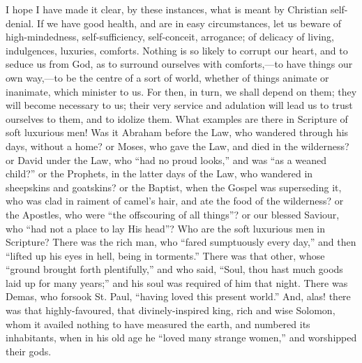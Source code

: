 I hope I have made it clear, by these instances, what is meant by
Christian self-denial. If we have good health, and are in easy
circumstances, let us beware of high-mindedness, self-sufficiency,
self-conceit, arrogance; of delicacy of living, indulgences, luxuries,
comforts. Nothing is so likely to corrupt our heart, and to seduce us
from God, as to surround ourselves with comforts,—to have things our
own way,—to be the centre of a sort of world, whether of things
animate or inanimate, which minister to us. For then, in turn, we
shall depend on them; they will become necessary to us; their very
service and adulation will lead us to trust ourselves to them, and to
idolize them. What examples are there in Scripture of soft luxurious
men! Was it Abraham before the Law, who wandered through his days,
without a home? or Moses, who gave the Law, and died in the
wilderness? or David under the Law, who ``had no proud
looks,'' and was ``as a weaned child?'' or the Prophets,
in the latter days of the Law, who wandered in sheepskins and
goatskins? or the Baptist, when the Gospel was superseding it, who was
clad in raiment of camel's hair, and ate the food of the wilderness?
or the Apostles, who were ``the offscouring of all things''?
or our blessed Saviour, who ``had not a place to lay His
head''? Who are the soft luxurious men in Scripture? There was the
rich man, who ``fared sumptuously every day,'' and then
``lifted up his eyes in hell, being in torments.'' There was
that other, whose ``ground brought forth plentifully,'' and
who said, ``Soul, thou hast much goods laid up for many
years;'' and his soul was required of him that night. There was
Demas, who forsook St. Paul, ``having loved this present
world.'' And, alas! there was that highly-favoured, that
divinely-inspired king, rich and wise Solomon, whom it availed nothing
to have measured the earth, and numbered its inhabitants, when in his
old age he ``loved many strange women,'' and worshipped their
gods.

